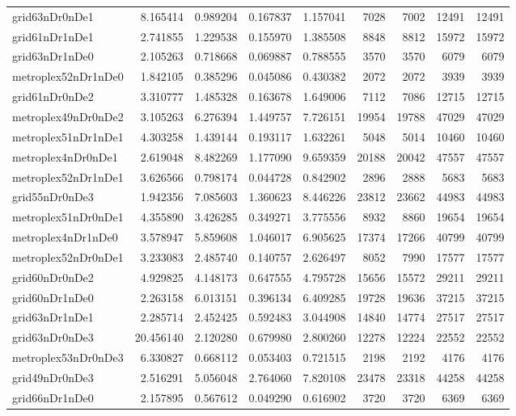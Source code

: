 \begin{longtable}{|l|r|r|r|r|r|r|r|r|}
grid63nDr0nDe1 & 8.165414 & 0.989204 & 0.167837 & 1.157041 & 7028 & 7002 & 12491 & 12491 \\
grid61nDr1nDe1 & 2.741855 & 1.229538 & 0.155970 & 1.385508 & 8848 & 8812 & 15972 & 15972 \\
grid63nDr1nDe0 & 2.105263 & 0.718668 & 0.069887 & 0.788555 & 3570 & 3570 & 6079 & 6079 \\
metroplex52nDr1nDe0 & 1.842105 & 0.385296 & 0.045086 & 0.430382 & 2072 & 2072 & 3939 & 3939 \\
grid61nDr0nDe2 & 3.310777 & 1.485328 & 0.163678 & 1.649006 & 7112 & 7086 & 12715 & 12715 \\
metroplex49nDr0nDe2 & 3.105263 & 6.276394 & 1.449757 & 7.726151 & 19954 & 19788 & 47029 & 47029 \\
metroplex51nDr1nDe1 & 4.303258 & 1.439144 & 0.193117 & 1.632261 & 5048 & 5014 & 10460 & 10460 \\
metroplex4nDr0nDe1 & 2.619048 & 8.482269 & 1.177090 & 9.659359 & 20188 & 20042 & 47557 & 47557 \\
metroplex52nDr1nDe1 & 3.626566 & 0.798174 & 0.044728 & 0.842902 & 2896 & 2888 & 5683 & 5683 \\
grid55nDr0nDe3 & 1.942356 & 7.085603 & 1.360623 & 8.446226 & 23812 & 23662 & 44983 & 44983 \\
metroplex51nDr0nDe1 & 4.355890 & 3.426285 & 0.349271 & 3.775556 & 8932 & 8860 & 19654 & 19654 \\
metroplex4nDr1nDe0 & 3.578947 & 5.859608 & 1.046017 & 6.905625 & 17374 & 17266 & 40799 & 40799 \\
metroplex52nDr0nDe1 & 3.233083 & 2.485740 & 0.140757 & 2.626497 & 8052 & 7990 & 17577 & 17577 \\
grid60nDr0nDe2 & 4.929825 & 4.148173 & 0.647555 & 4.795728 & 15656 & 15572 & 29211 & 29211 \\
grid60nDr1nDe0 & 2.263158 & 6.013151 & 0.396134 & 6.409285 & 19728 & 19636 & 37215 & 37215 \\
grid63nDr1nDe1 & 2.285714 & 2.452425 & 0.592483 & 3.044908 & 14840 & 14774 & 27517 & 27517 \\
grid63nDr0nDe3 & 20.456140 & 2.120280 & 0.679980 & 2.800260 & 12278 & 12224 & 22552 & 22552 \\
metroplex53nDr0nDe3 & 6.330827 & 0.668112 & 0.053403 & 0.721515 & 2198 & 2192 & 4176 & 4176 \\
grid49nDr0nDe3 & 2.516291 & 5.056048 & 2.764060 & 7.820108 & 23478 & 23318 & 44258 & 44258 \\
grid66nDr1nDe0 & 2.157895 & 0.567612 & 0.049290 & 0.616902 & 3720 & 3720 & 6369 & 6369 \\

\end{longtable}
